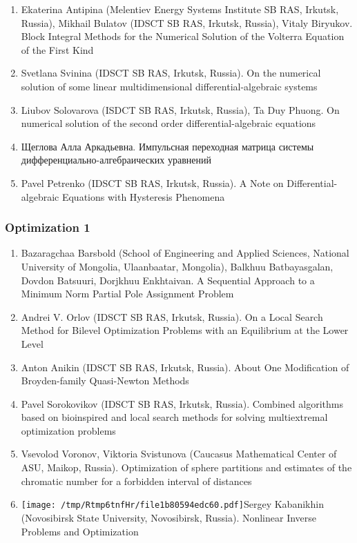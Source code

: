 \documentclass[
]{article}
\providecommand{\tightlist}{%
  \setlength{\itemsep}{0pt}\setlength{\parskip}{0pt}}
\begin{document}
\begin{enumerate}
\def\labelenumi{\arabic{enumi}.}
\tightlist
\item
  Ekaterina Antipina (Melentiev Energy Systems Institute SB RAS,
  Irkutsk, Russia), Mikhail Bulatov (IDSCT SB RAS, Irkutsk, Russia),
  Vitaly Biryukov. Block Integral Methods for the Numerical Solution of
  the Volterra Equation of the First Kind
\item
  Svetlana Svinina (IDSCT SB RAS, Irkutsk, Russia). On the numerical
  solution of some linear multidimensional differential-algebraic
  systems
\item
  Liubov Solovarova (ISDCT SB RAS, Irkutsk, Russia), Ta Duy Phuong. On
  numerical solution of the second order differential-algebraic
  equations
\item
  Щеглова Алла Аркадьевна. Импульсная переходная матрица системы
  дифференциально-алгебраических уравнений
\item
  Pavel Petrenko (IDSCT SB RAS, Irkutsk, Russia). A Note on
  Differential-algebraic Equations with Hysteresis Phenomena
\end{enumerate}

\hypertarget{o1}{%
\subsubsection{Optimization 1}\label{o1}}

\begin{enumerate}
\def\labelenumi{\arabic{enumi}.}
\tightlist
\item
  Bazaragchaa Barsbold (School of Engineering and Applied Sciences,
  National University of Mongolia, Ulaanbaatar, Mongolia), Balkhuu
  Batbayasgalan, Dovdon Batsuuri, Dorjkhuu Enkhtaivan. A Sequential
  Approach to a Minimum Norm Partial Pole Assignment Problem
\item
  Andrei V. Orlov (IDSCT SB RAS, Irkutsk, Russia). On a Local Search
  Method for Bilevel Optimization Problems with an Equilibrium at the
  Lower Level
\item
  Anton Anikin (IDSCT SB RAS, Irkutsk, Russia). About One Modification
  of Broyden-family Quasi-Newton Methods
\item
  Pavel Sorokovikov (IDSCT SB RAS, Irkutsk, Russia). Combined algorithms
  based on bioinspired and local search methods for solving
  multiextremal optimization problems
\item
  Vsevolod Voronov, Viktoria Svistunova (Caucasus Mathematical Center of
  ASU, Maikop, Russia). Optimization of sphere partitions and estimates
  of the chromatic number for a forbidden interval of distances
\item
  \protect\texttt{[image: /tmp/Rtmp6tnfHr/file1b80594edc60.pdf]}Sergey
  Kabanikhin (Novosibirsk State University, Novosibirsk, Russia).
  Nonlinear Inverse Problems and Optimization
\end{enumerate}
\end{document}
